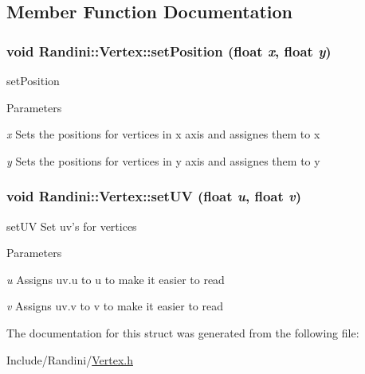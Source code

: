 \subsection{Member Function Documentation}
\hypertarget{structRandini_1_1Vertex_ad00ffb3af37c668d40f28ae2d8cce41b}{
\subsubsection[{setPosition}]{\setlength{\rightskip}{0pt plus 5cm}void Randini::Vertex::setPosition (float {\em x}, \/  float {\em y})}}
\label{structRandini_1_1Vertex_ad00ffb3af37c668d40f28ae2d8cce41b}


setPosition 
\begin{DoxyParams}{Parameters}
\item[{\em x}]Sets the positions for vertices in x axis and assignes them to x \item[{\em y}]Sets the positions for vertices in y axis and assignes them to y \end{DoxyParams}
\hypertarget{structRandini_1_1Vertex_a1433f80829a7d1c3486ac9ef669e3e76}{
\subsubsection[{setUV}]{\setlength{\rightskip}{0pt plus 5cm}void Randini::Vertex::setUV (float {\em u}, \/  float {\em v})}}
\label{structRandini_1_1Vertex_a1433f80829a7d1c3486ac9ef669e3e76}


setUV Set uv's for vertices 
\begin{DoxyParams}{Parameters}
\item[{\em u}]Assigns uv.u to u to make it easier to read \item[{\em v}]Assigns uv.v to v to make it easier to read \end{DoxyParams}


The documentation for this struct was generated from the following file:\begin{DoxyCompactItemize}
\item 
Include/Randini/\hyperlink{Vertex_8h}{Vertex.h}\end{DoxyCompactItemize}
